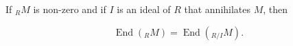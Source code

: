 If $_R M$ is non-zero and if $I$ is an ideal of $R$ that annihilates $M$, then

$$\operatorname{End}(_R M) = \operatorname{End}(_{R/I} M).$$
